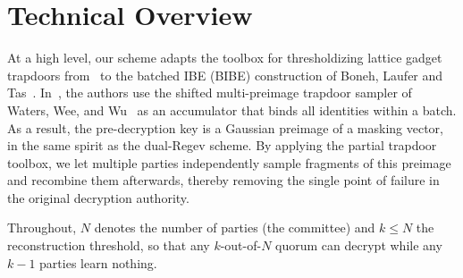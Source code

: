 
% 
\label{chapter3:Our Threshold Batch Decryption system}

\section{Technical Overview}
At a high level, our scheme adapts the toolbox for thresholdizing lattice gadget
trapdoors from~\cite{AC:ALLW25} to the batched IBE (BIBE) construction of
Boneh, Laufer and Tas~\cite{EPRINT:BonLauTas25}. In~\cite{EPRINT:BonLauTas25},
the authors use the shifted multi-preimage trapdoor sampler of Waters, Wee, and
Wu~\cite{EC:WatWeeWu25} as an accumulator that binds all identities within a
batch. As a result, the pre-decryption key is a Gaussian preimage of a masking
vector, in the same spirit as the dual-Regev scheme. By applying the partial
trapdoor toolbox, we let multiple parties independently sample fragments of this
preimage and recombine them afterwards, thereby removing the single point of
failure in the original decryption authority.

Throughout, $N$ denotes the number of parties (the committee) and $k\le N$ the
reconstruction threshold, so that any $k$-out-of-$N$ quorum can decrypt while any
$k-1$ parties learn nothing.

